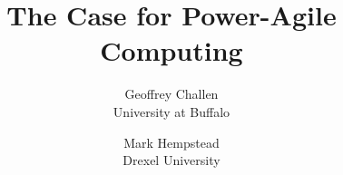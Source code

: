 


\date{}

\title{\Large \bf The Case for Power-Agile Computing}

\author{
{\rm Geoffrey Challen}\\
University at Buffalo
\and
{\rm Mark Hempstead}\\
Drexel University
} %

\maketitle




{\footnotesize

}


